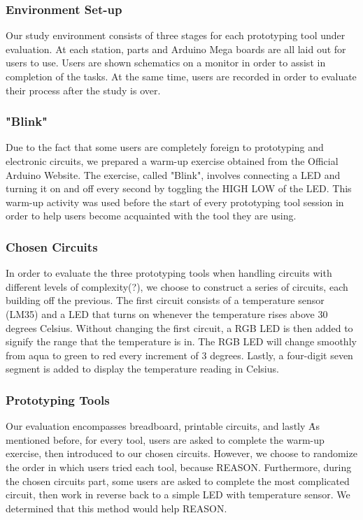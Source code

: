 \subsubsection{Environment Set-up}
Our study environment consists of three stages for each prototyping tool under evaluation. At each station, parts and Arduino Mega boards are all laid out for users to use. Users are shown schematics on a monitor in order to assist in completion of the tasks. At the same time, users are recorded in order to evaluate their process after the study is over.

\subsubsection{"Blink"}
Due to the fact that some users are completely foreign to prototyping and electronic circuits, we prepared a warm-up exercise obtained from the Official Arduino Website. The exercise, called "Blink", involves connecting a LED and turning it on and off every second by toggling the HIGH LOW of the LED. This warm-up activity was used before the start of every prototyping tool session in order to help users become acquainted with the tool they are using.

\subsubsection{Chosen Circuits}
In order to evaluate the three prototyping tools when handling circuits with different levels of complexity(?), we choose to construct a series of circuits, each building off the previous. The first circuit consists of a temperature sensor (LM35) and a LED that turns on whenever the temperature rises above 30 degrees Celsius. Without changing the first circuit, a RGB LED is then added to signify the range that the temperature is in. The RGB LED will change smoothly from aqua to green to red every increment of 3 degrees. Lastly, a four-digit seven segment is added to display the temperature reading in Celsius.

\subsubsection{Prototyping Tools}
Our evaluation encompasses breadboard, printable circuits, and lastly \papertitle\. As mentioned before, for every tool, users are asked to complete the warm-up exercise, then introduced to our chosen circuits. However, we choose to randomize the order in which users tried each tool, because REASON. Furthermore, during the chosen circuits part, some users are asked to complete the most complicated circuit, then work in reverse back to a simple LED with temperature sensor. We determined that this method would help REASON. 

